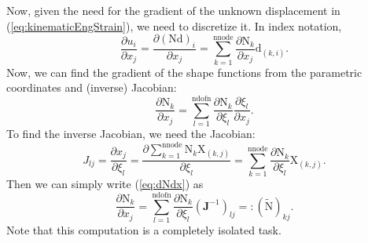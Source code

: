 \documentclass[12pt,a4paper]{article}
\theoremstyle{remark} %
\newcommand{\bu}[1]{\bm{\mathrm #1}} %
\numberwithin{equation}{section} %
\begin{document}
Now, given the need for the gradient of the unknown displacement in (\ref{eq:kinematicEngStrain}), we need to discretize it. In index notation,
\begin{equation} \label{eq:dudx}
	\frac{\partial u_i}{\partial x_j} = \frac{\partial (\mathrm N \mathrm d)_i}{\partial x_j} = \sum_{k = 1}^{\text{nnode}} \frac{\partial \mathrm N_k}{\partial x_j} \mathrm d_{(k, i)} .
\end{equation}
%
Now, we can find the gradient of the shape functions from the parametric coordinates and (inverse) Jacobian:
\begin{equation} \label{eq:dNdx}
	\frac{\partial \mathrm N_k}{\partial x_j} = \sum_{l = 1}^{\text{ndofn}} \frac{\partial \mathrm N_k}{\partial \xi_l} \frac{\partial \xi_l}{\partial x_j} .
\end{equation}
To find the inverse Jacobian, we need the Jacobian:
\begin{equation}
	J_{lj} = \frac{\partial x_j}{\partial \xi_l} = \frac{\partial \sum_{k = 1}^{\text{nnode}} \mathrm N_k \mathrm X_{(k, j)}}{\partial \xi_l} = \sum_{k = 1}^{\text{nnode}} \frac{\partial \mathrm N_k}{\partial \xi_l} \mathrm X_{(k, j)} .
\end{equation}
Then we can simply write (\ref{eq:dNdx}) as
\begin{equation}
	\frac{\partial \mathrm N_k}{\partial x_j} = \sum_{l = 1}^{\text{ndofn}} \frac{\partial \mathrm N_k}{\partial \xi_l} (\bm J^{-1})_{lj} =: (\tilde{\bu N})_{kj}.
\end{equation}
Note that this computation is a completely isolated task.
\end{document}
